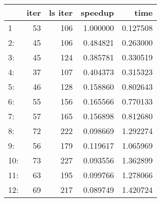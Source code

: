 \begin{tabular}{lrrrr}
\toprule
{} &  iter &  ls iter &   speedup &      time \\
\midrule
1   &    53 &      106 &  1.000000 &  0.127508 \\
2:  &    45 &      106 &  0.484821 &  0.263000 \\
3:  &    45 &      124 &  0.385781 &  0.330519 \\
4:  &    37 &      107 &  0.404373 &  0.315323 \\
5:  &    46 &      128 &  0.158860 &  0.802643 \\
6:  &    55 &      156 &  0.165566 &  0.770133 \\
7:  &    57 &      165 &  0.156898 &  0.812680 \\
8:  &    72 &      222 &  0.098669 &  1.292274 \\
9:  &    56 &      179 &  0.119617 &  1.065969 \\
10: &    73 &      227 &  0.093556 &  1.362899 \\
11: &    63 &      195 &  0.099766 &  1.278066 \\
12: &    69 &      217 &  0.089749 &  1.420724 \\
\bottomrule
\end{tabular}
